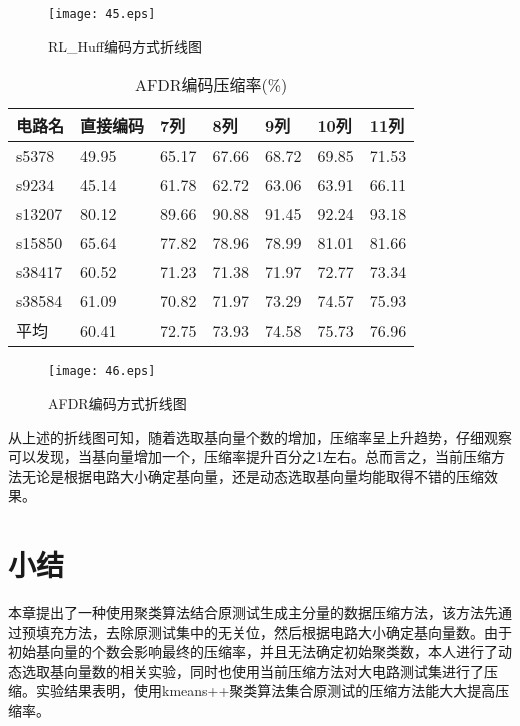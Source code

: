 \begin{figure}[H]
  \centering
  \texttt{[image: 45.eps]}
  \caption{RL\_Huff编码方式折线图}\label{45}
     \end{figure}


\begin{table}[H]
\centering
\caption{AFDR编码压缩率(\%)}\label{ptabl13}
\begin{tabular}{p{1.4cm}p{2cm}<{\centering}p{1.8cm}<{\centering}p{1.8cm}<{\centering}p{1.8cm}<{\centering}
p{1.8cm}<{\centering}p{1.8cm}<{\centering}}
\toprule
\textbf{电路名}&	\textbf{直接编码}& \textbf{7列}& \textbf{8列}& \textbf{9列}& \textbf{10列}& \textbf{11列}\\
\midrule
s5378&	49.95&	65.17&	67.66&	68.72&	69.85&	71.53\\
s9234&	45.14&	61.78&	62.72&	63.06&	63.91&	66.11\\
s13207&	80.12&	89.66&	90.88&	91.45&	92.24&	93.18\\
s15850&	65.64&	77.82&	78.96&	78.99&	81.01&	81.66\\
s38417&	60.52&	71.23&	71.38&	71.97&	72.77&	73.34\\
s38584&	61.09&	70.82&	71.97&	73.29&	74.57&	75.93\\
平均&	60.41&	72.75&	73.93&	74.58&	75.73&	76.96\\
\bottomrule
\end{tabular}
\end{table}

\begin{figure}[H]
  \centering
  \texttt{[image: 46.eps]}
  \caption{AFDR编码方式折线图}\label{46}
     \end{figure}

从上述的折线图可知，随着选取基向量个数的增加，压缩率呈上升趋势，仔细观察可以发现，当基向量增加一个，压缩率提升百分之1左右。总而言之，当前压缩方法无论是根据电路大小确定基向量，还是动态选取基向量均能取得不错的压缩效果。

\section{小结}

本章提出了一种使用聚类算法结合原测试生成主分量的数据压缩方法，该方法先通过预填充方法，去除原测试集中的无关位，然后根据电路大小确定基向量数。由于初始基向量的个数会影响最终的压缩率，并且无法确定初始聚类数，本人进行了动态选取基向量数的相关实验，同时也使用当前压缩方法对大电路测试集进行了压缩。实验结果表明，使用kmeans++聚类算法集合原测试的压缩方法能大大提高压缩率。
